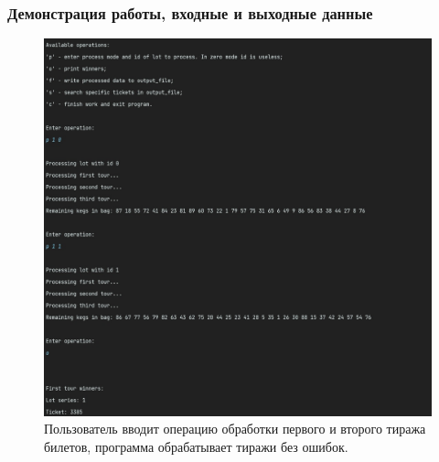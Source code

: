 \documentclass[a4paper,14pt]{article}
\begin{document}
\clearpage
\begin{center}
    \subsubsection{Демонстрация работы, входные и выходные данные}
\end{center}


\begin{figure}[H]
  \includegraphics[width=\linewidth]{pictures/1}
  \caption{Пользователь вводит операцию обработки первого и второго тиража билетов, программа обрабатывает тиражи без ошибок.}
\end{figure}
\end{document}
